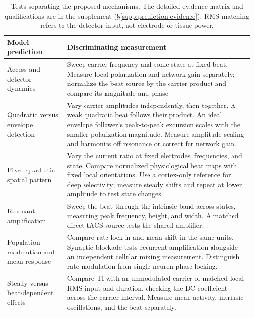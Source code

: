 \documentclass[a4paper]{article}
\begin{document}
\begin{table}[htbp]
\centering\small
\renewcommand{\arraystretch}{1.15}
\begin{tabular}{@{}>{\raggedright\arraybackslash}p{}
 >{\raggedright\arraybackslash}p{}@{}}
\toprule
Model prediction & Discriminating measurement \\
\midrule
Access and detector dynamics & Sweep carrier frequency and tonic state at fixed
beat. Measure local polarization and network gain separately; normalize the
beat source by the carrier product and compare its magnitude and phase. \\[4pt]
Quadratic versus envelope detection & Vary carrier amplitudes independently,
then together. A weak quadratic beat follows their product. An ideal envelope
follower's peak-to-peak excursion scales with the smaller polarization magnitude.
Measure amplitude scaling and harmonics off resonance or correct for network gain. \\[4pt]
Fixed quadratic spatial pattern & Vary the current ratio at fixed electrodes,
frequencies, and state. Compare normalized physiological beat maps with fixed
local orientations. Use a cortex-only reference for deep selectivity; measure
steady shifts and repeat at lower amplitude to test state changes. \\[4pt]
Resonant amplification & Sweep the beat through the intrinsic band across
states, measuring peak frequency, height, and width. A matched direct tACS
source tests the shared amplifier. \\[4pt]
Population modulation and mean response & Compare rate lock-in and mean shift
in the same units. Synaptic blockade tests recurrent amplification alongside
an independent cellular mixing measurement. Distinguish rate modulation from
single-neuron phase locking. \\[4pt]
Steady versus beat-dependent effects & Compare TI with an unmodulated carrier
of matched local RMS input and duration, checking the DC coefficient across
the carrier interval. Measure mean activity, intrinsic oscillations, and the
beat separately. \\
\bottomrule
\end{tabular}
\caption{Tests separating the proposed mechanisms. The detailed evidence matrix
and qualifications are in the supplement (\S\ref{supp:prediction-evidence}).
RMS matching refers to the detector input, not electrode or tissue power.}
\label{tab:predictions}
\end{table}
\end{document}
